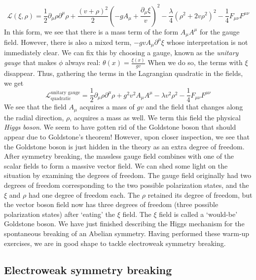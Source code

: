 \begin{equation*}
\mathcal{L}(\xi,\rho) = \frac{1}{2}\partial_\mu\rho\partial^\mu\rho + \frac{(v + \rho)^2}{2}%
\left(-gA_\mu+\frac{\partial_\mu\xi}{v}\right)^2-\frac{\lambda}{4}\left(\rho^2 + 2v\rho^2\right)^2%
-\frac{1}{4}F_{\mu\nu}F^{\mu\nu}
\end{equation*}
In this form, we see that there is a mass term of the form $A_\mu A^\mu$ for the gauge field. However, there is also a mixed term, $-gvA_\mu\partial^\mu\xi$ whose interpretation is not immediately clear. We can fix this by choosing a gauge, known as the \emph{unitary gauge} that makes $\phi$ always real:
$\theta(x) = \frac{\xi(x)}{gv}$
When we do so, the terms with $\xi$ disappear. Thus, gathering the terms in the Lagrangian quadratic in the fields, we get
\begin{equation}
\mathcal{L}_\text{quadratic}^\text{unitary gauge} = \frac{1}{2}\partial_\mu\rho\partial^\mu\rho + g^2v^2 A_\mu A^\mu - \lambda v^2\rho^2 - \frac{1}{4}F_{\mu\nu}F^{\mu\nu}
\end{equation}
We see that the field $A_\mu$ acquires a mass of $gv$ and the field that changes along the radial direction, $\rho$, acquires a mass as well. We term this field the physical \emph{Higgs boson}. We seem to have gotten rid of the Goldstone boson that should appear due to Goldstone’s theorem! However, upon closer inspection, we see that the Goldstone boson is just hidden in the theory as an extra degree of freedom. After symmetry breaking, the massless gauge field combines with one of the scalar fields to form a massive vector field. We can shed some light on the situation by examining the degrees of freedom. The gauge field originally had two degrees of freedom corresponding
to the two possible polarization states, and the $\xi$ and $\rho$ had one degree of freedom each. The $\rho$ retained its degree of freedom, but the vector boson field now has three degrees of freedom (three possible polarization states) after `eating' the $\xi$ field. The $\xi$ field is called a `would-be' Goldstone boson. We have just finished describing the Higgs mechanism for the spontaneous breaking of an Abelian symmetry. Having performed these warm-up exercises, we are in good shape to tackle electroweak symmetry breaking.


\subsection{Electroweak symmetry breaking}

